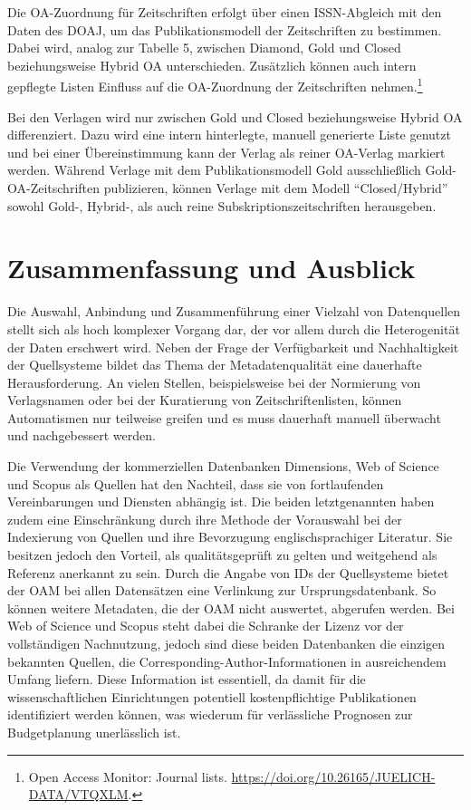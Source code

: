 \documentclass[a4paper,
fontsize=11pt,
oneside,
numbers=noperiodatend,
parskip=half-,
bibliography=totoc,
final
]{scrartcl}
\begin{document}
Die OA-Zuordnung für Zeitschriften erfolgt über einen ISSN-Abgleich mit
den Daten des DOAJ, um das Publikationsmodell der Zeitschriften zu
bestimmen. Dabei wird, analog zur Tabelle 5, zwischen Diamond, Gold und
Closed beziehungsweise Hybrid OA unterschieden. Zusätzlich können auch
intern gepflegte Listen Einfluss auf die OA-Zuordnung der Zeitschriften
nehmen.\footnote{Open Access Monitor: Journal lists.
  \url{https://doi.org/10.26165/JUELICH-DATA/VTQXLM}.}

Bei den Verlagen wird nur zwischen Gold und Closed beziehungsweise
Hybrid OA differenziert. Dazu wird eine intern hinterlegte, manuell
generierte Liste genutzt und bei einer Übereinstimmung kann der Verlag
als reiner OA-Verlag markiert werden. Während Verlage mit dem
Publikationsmodell Gold ausschließlich Gold-OA-Zeitschriften
publizieren, können Verlage mit dem Modell \enquote{Closed/Hybrid}
sowohl Gold-, Hybrid-, als auch reine Subskriptionszeitschriften
herausgeben.

\hypertarget{zusammenfassung-und-ausblick}{%
\section{Zusammenfassung und
Ausblick}\label{zusammenfassung-und-ausblick}}

Die Auswahl, Anbindung und Zusammenführung einer Vielzahl von
Datenquellen stellt sich als hoch komplexer Vorgang dar, der vor allem
durch die Heterogenität der Daten erschwert wird. Neben der Frage der
Verfügbarkeit und Nachhaltigkeit der Quellsysteme bildet das Thema der
Metadatenqualität eine dauerhafte Herausforderung. An vielen Stellen,
beispielsweise bei der Normierung von Verlagsnamen oder bei der
Kuratierung von Zeitschriftenlisten, können Automatismen nur teilweise
greifen und es muss dauerhaft manuell überwacht und nachgebessert
werden.

Die Verwendung der kommerziellen Datenbanken Dimensions, Web of Science
und Scopus als Quellen hat den Nachteil, dass sie von fortlaufenden
Vereinbarungen und Diensten abhängig ist. Die beiden letztgenannten
haben zudem eine Einschränkung durch ihre Methode der Vorauswahl bei der
Indexierung von Quellen und ihre Bevorzugung englischsprachiger
Literatur. Sie besitzen jedoch den Vorteil, als qualitätsgeprüft zu
gelten und weitgehend als Referenz anerkannt zu sein. Durch die Angabe
von IDs der Quellsysteme bietet der OAM bei allen Datensätzen eine
Verlinkung zur Ursprungsdatenbank. So können weitere Metadaten, die der
OAM nicht auswertet, abgerufen werden. Bei Web of Science und Scopus
steht dabei die Schranke der Lizenz vor der vollständigen Nachnutzung,
jedoch sind diese beiden Datenbanken die einzigen bekannten Quellen, die
Corresponding-Author-Informationen in ausreichendem Umfang liefern.
Diese Information ist essentiell, da damit für die wissenschaftlichen
Einrichtungen potentiell kostenpflichtige Publikationen identifiziert
werden können, was wiederum für verlässliche Prognosen zur Budgetplanung
unerlässlich ist.
\end{document}

